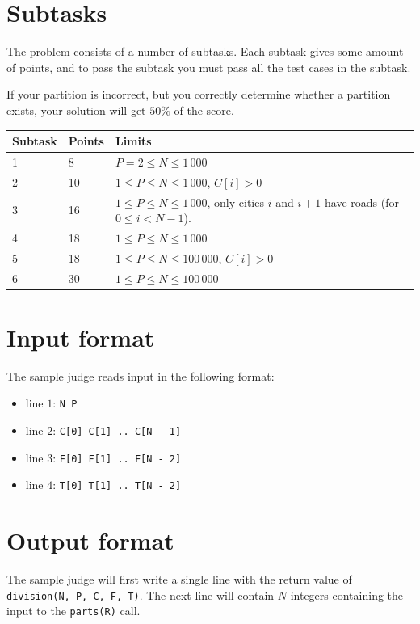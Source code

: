 \section*{Subtasks}
The problem consists of a number of subtasks. Each subtask gives some amount of points, and to pass
the subtask you must pass all the test cases in the subtask.

If your partition is incorrect, but you correctly determine whether a partition exists, your solution
will get $50\%$ of the score. 
\begin{tabular}{|l|l|l|}
  \hline
  \textbf{Subtask} & \textbf{Points} & \textbf{Limits} \\ \hline
  1 & 8 & $P = 2 \le N \le 1\,000$ \\ \hline
  2 & 10 & $1 \le P \le N \le 1\,000$, $C[i] > 0$ \\ \hline
  3 & 16 & $1 \le P \le N \le 1\,000$, only cities $i$ and $i + 1$ have roads (for $0 \le i < N - 1$). \\ \hline
  4 & 18 & $1 \le P \le N \le 1\,000$ \\ \hline
  5 & 18 & $1 \le P \le N \le 100\,000$, $C[i] > 0$ \\ \hline
  6 & 30 & $1 \le P \le N \le 100\,000$ \\ \hline
\end{tabular}

\section*{Input format}
The sample judge reads input in the following format:

\begin{itemize}
  \item line $1$: \texttt{N P}
  \item line $2$: \texttt{C[0] C[1] .. C[N - 1]}
  \item line $3$: \texttt{F[0] F[1] .. F[N - 2]}
  \item line $4$: \texttt{T[0] T[1] .. T[N - 2]}
\end{itemize}

\section*{Output format}
The sample judge will first write a single line with the return value of \texttt{division(N, P, C, F, T)}. The next line will contain $N$ integers containing the input to the \texttt{parts(R)} call.
